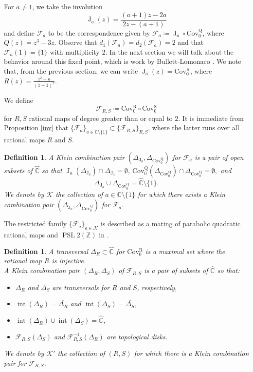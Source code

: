 \documentclass[11pt,letterpaper]{article}
\newtheorem{definition}[theorem]{Definition}
\theoremstyle{definition}
\def\PSL{\operatorname{PSL}}
\def\covr{\operatorname{Cov^R_0}}
\def\covs{\operatorname{Cov^S_0}}
\def\covq{\operatorname{Cov^Q_0}}
\def\interior{\operatorname{int}}
\def\F{\mathcal{F}_a}
\def\J{\operatorname{J}_a}
\begin{document}
For $a\neq 1$, we take the involution
$$\J(z)=\frac{(a+1)z-2a}{2z-(a+1)}$$
and define $\F$ to be the correspondence given by $\F\coloneqq\J\circ\covq$, where $Q(z)=z^3-3z$. Observe that $d_1(\F)=d_2(\F)=2$ and that $\F(1)=\lbrace 1\rbrace$ with multiplicity $2$. In the next section we will talk about the behavior around this fixed point, which is work by Bullett-Lomonaco \cite{BulLom20I}. We note that, from the previous section, we can write $\J(z)=\covr$, where $R(z)=\frac{z^2-a}{(z-1)^2}.$

We define
$$\mathcal{F}_{R,S}\coloneqq\covr\circ\covs$$
for $R,S$ rational maps of degree greater than or equal to $2$. It is immediate from Proposition \ref{inv} that $\lbrace\F\rbrace_{a\in\mathbb{C}\setminus\lbrace 1\rbrace}\subset\lbrace\mathcal{F}_{R,S}\rbrace_{R,S}$, where the latter runs over all rational maps $R$ and $S$.

\begin{definition}

A \emph{Klein combination pair} $(\Delta_{\J},\Delta_{\covq})$ for $\F$ is a pair of open subsets of $\widehat{\mathbb{C}}$ so that $\J(\Delta_{\J})\cap\Delta_{\J}=\emptyset$, $\covq(\Delta_{\covq})\cap\Delta_{\covq}=\emptyset,$ and 
$$\Delta_{\J}\cup\Delta_{\covq}=\widehat{\mathbb{C}}\setminus\lbrace 1\rbrace.$$
We denote by $\mathcal{K}$ the collection of $a\in\mathbb{C}\setminus\lbrace 1\rbrace$ for which there exists a Klein combination pair $(\Delta_{\J},\Delta_{\covq})$ for $\F$. 
\end{definition}

The restricted family $\lbrace \F\rbrace_{a\in\mathcal{K}}$ is described as a mating of parabolic quadratic rational maps and $\PSL2(\mathbb{Z})$ in  \cite{BulLom20I}.
\begin{definition}
A \emph{transversal} $\Delta_R\subset\widehat{\mathbb{C}}$ for $\covr$ is a maximal set where the rational map $R$ is injective.
\\
A \emph{Klein combination pair} $(\Delta_R,\Delta_S)$ of $\mathcal{F}_{R,S}$ is a pair of subsets of $\widehat{\mathbb{C}}$ so that:
\begin{itemize}
\item $\Delta_R$ and $\Delta_S$ are transversals for $R$ and $S$, respectively,
\item $\overline{\interior(\Delta_R)}=\overline{\Delta_R}$ and $\overline{\interior(\Delta_S)}=\overline{\Delta_S}$,
\item $\interior(\Delta_R)\cup\interior(\Delta_S)=\widehat{\mathbb{C}}$,
\item $\mathcal{F}_{R,S}(\Delta_S)$ and $\mathcal{F}_{R,S}^{-1}(\Delta_R)$ are topological disks.
\end{itemize}
We denote by $\mathcal{K}'$ the collection of $(R,S)$ for which there is a Klein combination pair for $\mathcal{F}_{R,S}$.
\end{definition}
\end{document}
